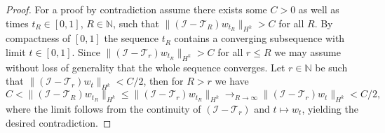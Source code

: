 \documentclass[10pt,a4paper]{amsart}
\newcommand{\Id}{{\mathcal{I}}}
\newcommand{\N}{\mathbb{N}}
\newcommand{\trunc}[1][R]{\mathcal{T}_{#1}}
\begin{document}
\begin{proof}
For a proof by contradiction assume there exists some $C>0$ as well as times $t_R\in[0,1]$, $R\in\N$, such that $\|(\Id-\trunc)w_{t_R}\|_{H^k}>C$ for all $R$.
By compactness of $[0,1]$ the sequence $t_R$ contains a converging subsequence with limit $t\in[0,1]$.
Since $\|(\Id-\trunc[r])w_{t_R}\|_{H^k}>C$ for all $r\leq R$ we may assume without loss of generality that the whole sequence converges.
Let $r\in\N$ be such that $\|(\Id-\trunc[r])w_t\|_{H^k}<C/2$,
then for $R>r$ we have
\begin{equation*}
C
<\|(\Id-\trunc)w_{t_R}\|_{H^k}
\leq\|(\Id-\trunc[r])w_{t_R}\|_{H^k}
\mathop\to_{R\to\infty}\|(\Id-\trunc[r])w_t\|_{H^k}
<C/2,
\end{equation*}
where the limit follows from the continuity of $(\Id-\trunc[r])$ and $t\mapsto w_t$,
yielding the desired contradiction.
\end{proof}
\end{document}
